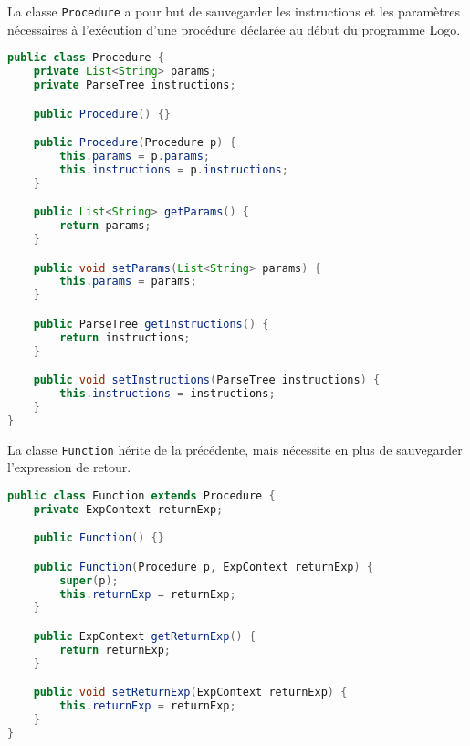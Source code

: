\documentclass[a4paper,11pt]{article}
\begin{document}
La classe \lstinline$Procedure$ a pour but de sauvegarder les instructions et les paramètres nécessaires à l'exécution d'une procédure déclarée au début du programme Logo.
\begin{lstlisting}[language=Java]
public class Procedure {
    private List<String> params;
    private ParseTree instructions;

    public Procedure() {}

    public Procedure(Procedure p) {
        this.params = p.params;
        this.instructions = p.instructions;
    }

    public List<String> getParams() {
        return params;
    }

    public void setParams(List<String> params) {
        this.params = params;
    }

    public ParseTree getInstructions() {
        return instructions;
    }

    public void setInstructions(ParseTree instructions) {
        this.instructions = instructions;
    }
}
\end{lstlisting}

La classe \lstinline$Function$ hérite de la précédente, mais nécessite en plus de sauvegarder l'expression de retour.
\begin{lstlisting}[language=Java]
public class Function extends Procedure {
    private ExpContext returnExp;

    public Function() {}

    public Function(Procedure p, ExpContext returnExp) {
        super(p);
        this.returnExp = returnExp;
    }

    public ExpContext getReturnExp() {
        return returnExp;
    }

    public void setReturnExp(ExpContext returnExp) {
        this.returnExp = returnExp;
    }
}
\end{lstlisting}
\end{document}
